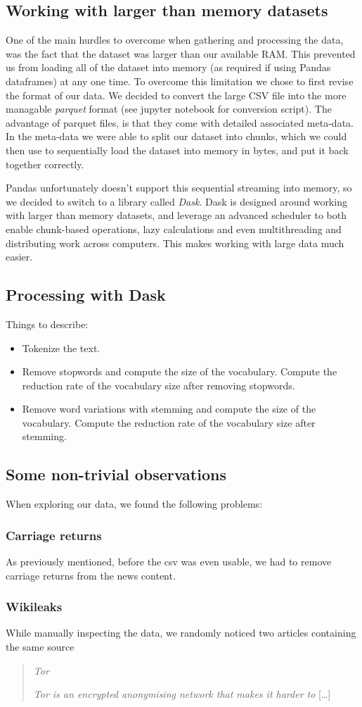 \subsection{Working with larger than memory datasets}
One of the main hurdles to overcome when gathering and processing the data, was the fact that the dataset was larger
than our available RAM. This prevented us from loading all of the dataset into memory (as required if using Pandas
dataframes) at any one time. To overcome this limitation we chose to first revise the format of our data. We decided to
convert the large CSV file into the more managable \textit{parquet} format (see jupyter notebook for conversion script). The advantage of parquet files, is that they
come with detailed associated meta-data. In the meta-data we were able to split our dataset into chunks, which we could
then use to sequentially load the dataset into memory in bytes, and put it back together correctly.

Pandas unfortunately doesn't support this sequential streaming into memory, so we decided to switch to a library called
\textit{Dask}. Dask is designed around working with larger than memory datasets, and leverage an advanced scheduler to both
enable chunk-based operations, lazy calculations and even multithreading and distributing work across computers. This makes working with large data much easier.
\subsection{Processing with Dask}
Things to describe:
\begin{itemize}
    \item Tokenize the text.
    \item Remove stopwords and compute the size of the vocabulary. Compute the reduction rate of the vocabulary size after removing stopwords.
    \item Remove word variations with stemming and compute the size of the vocabulary. Compute the reduction rate of the vocabulary size after stemming.
\end{itemize}
    
    
    

\subsection{Some non-trivial observations}
When exploring our data, we found the following problems:
\subsubsection{Carriage returns}
As previously mentioned, before the csv was even usable, we had to remove carriage returns from the news content.
\subsubsection{Wikileaks}
While manually inspecting the data, we randomly noticed two articles containing the same source
\begin{quote}
    \textit{Tor}

    \textit{Tor is an encrypted anonymising network that makes it harder to} [\dots]\\

\end{quote}
